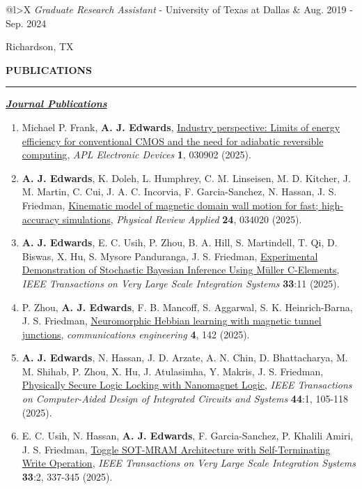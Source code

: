 \documentclass[12pt]{article}
\begin{document}
\begin{tabularx}{\linewidth}{{@{}l>{\raggedleft\arraybackslash}X}}
  \textit{Graduate Research Assistant} - University of Texas at Dallas     & Aug. 2019 - Sep. 2024 
    \end{tabularx}
    Richardson, TX
    \vspace{2em}


{\Large \textbf{PUBLICATIONS}}

\textcolor{gray}{\rule{\textwidth}{2pt}}

{\large \textit{\textbf{\ul{Journal Publications}}}}

\begin{enumerate}
\item Michael P. Frank, \textbf{A. J. Edwards}, \href{https://doi.org/10.1063/5.0279617}{Industry perspective: Limits of energy efficiency for conventional CMOS and the need for adiabatic reversible computing}, \textit{APL Electronic Devices} \textbf{1}, 030902 (2025).
\item \textbf{A. J. Edwards}, K. Doleh, L. Humphrey, C. M. Linseisen, M. D. Kitcher, J. M. Martin, C. Cui, J. A. C. Incorvia, F. Garcia-Sanchez, N. Hassan, J. S. Friedman, \href{https://journals.aps.org/prapplied/abstract/10.1103/v9tg-9l9r}{Kinematic model of magnetic domain wall motion for fast; high-accuracy simulations}, \textit{Physical Review Applied} \textbf{24}, 034020 (2025).
\item \textbf{A. J. Edwards}, E. C. Usih, P. Zhou, B. A. Hill, S. Martindell, T. Qi, D. Biswas, X. Hu, S. Mysore Panduranga, J. S. Friedman, \href{https://ieeexplore.ieee.org/document/11098964}{Experimental Demonstration of Stochastic Bayesian Inference Using Müller C-Elements}, \textit{IEEE Transactions on Very Large Scale Integration Systems} \textbf{33}:11 (2025).
\item P. Zhou, \textbf{A. J. Edwards}, F. B. Mancoff, S. Aggarwal, S. K. Heinrich-Barna, J. S. Friedman, \href{https://www.nature.com/articles/s44172-025-00479-2}{Neuromorphic Hebbian learning with magnetic tunnel junctions}, \textit{communications engineering} \textbf{4}, 142 (2025).
\item \textbf{A. J. Edwards}, N. Hassan, J. D. Arzate, A. N. Chin, D. Bhattacharya, M. M. Shihab, P. Zhou, X. Hu, J. Atulasimha, Y. Makris, J. S. Friedman, \href{https://ieeexplore.ieee.org/document/10611730}{Physically Secure Logic Locking with Nanomagnet Logic}, \textit{IEEE Transactions on Computer-Aided Design of Integrated Circuits and Systems} \textbf{44}:1, 105-118 (2025).
\item E. C. Usih, N. Hassan, \textbf{A. J. Edwards}, F. Garcia-Sanchez, P. Khalili Amiri, J. S. Friedman, \href{https://ieeexplore.ieee.org/document/10710331}{Toggle SOT-MRAM Architecture with Self-Terminating Write Operation}, \textit{IEEE Transactions on Very Large Scale Integration Systems} \textbf{33}:2, 337-345 (2025).

\end{enumerate}
\end{document}
